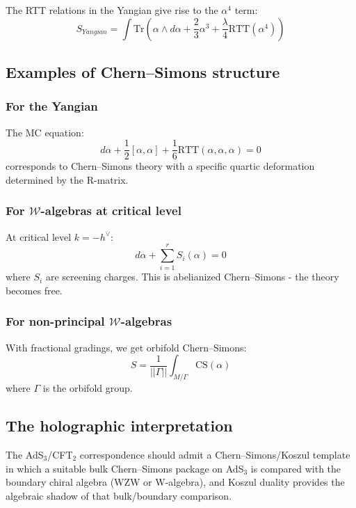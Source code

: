 The RTT relations in the Yangian give rise to the $\alpha^4$ term:
\[
S_{Yangian} = \int \text{Tr}\left(\alpha \wedge d\alpha + \frac{2}{3}\alpha^3 + \frac{\lambda}{4}\text{RTT}(\alpha^4)\right)
\]

\subsection{Examples of Chern--Simons structure}

\subsubsection{For the Yangian}

The MC equation:
\[
d\alpha + \frac{1}{2}[\alpha, \alpha] + \frac{1}{6}\text{RTT}(\alpha, \alpha, \alpha) = 0
\]
corresponds to Chern--Simons theory with a specific quartic deformation determined by the R-matrix.

\subsubsection{For $\mathcal{W}$-algebras at critical level}

At critical level $k = -h^\vee$:
\[
d\alpha + \sum_{i=1}^r S_i(\alpha) = 0
\]
where $S_i$ are screening charges. This is abelianized Chern--Simons - the theory becomes free.

\subsubsection{For non-principal $\mathcal{W}$-algebras}

With fractional gradings, we get orbifold Chern--Simons:
\[
S = \frac{1}{||\Gamma||} \int_{M/\Gamma} \text{CS}(\alpha)
\]
where $\Gamma$ is the orbifold group.

\subsection{The holographic interpretation}

\begin{conjecture}
\label{conj:ads-cft-cs-koszul}
The AdS$_3$/CFT$_2$ correspondence should admit a
Chern--Simons/Koszul template in which a suitable bulk Chern--Simons
package on AdS$_3$ is compared with the boundary chiral algebra (WZW or
W-algebra), and Koszul duality provides the algebraic shadow of that
bulk/boundary comparison.
\end{conjecture}

